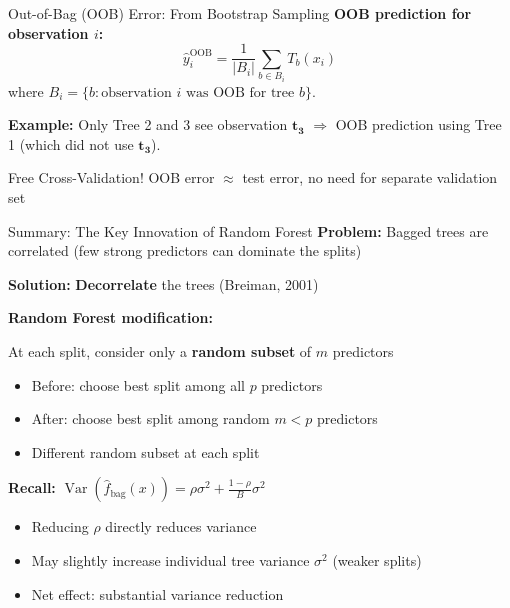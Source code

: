 \documentclass[10pt]{beamer}
\newcommand{\highlight}[1]{\textcolor{AccentOrange}{\textbf{#1}}}
\DeclareMathOperator{\Var}{Var}
\begin{document}
\begin{frame}{Out-of-Bag (OOB) Error: From Bootstrap Sampling}
  \vspace{0.2em}
\textbf{OOB prediction for observation $i$:}
  \[
  \widehat{y}_i^{\text{OOB}} = \frac{1}{|B_i|} \sum_{b \in B_i} T_b(x_i)
  \]
  where $B_i = \{b : \text{observation } i \text{ was OOB for tree } b\}$.

  \vspace{1em}
  \textbf{Example:} Only Tree 2 and 3 see observation $\mathbf{t_3}$ $\Rightarrow$ OOB prediction using Tree 1 (which did not use $\mathbf{t_3}$).

  \vspace{0.3em}
  \begin{block}{Free Cross-Validation!}
    OOB error $\approx$ test error, no need for separate validation set
  \end{block}
\end{frame}


\begin{frame}{Summary: The Key Innovation of Random Forest}
  \textbf{Problem:} Bagged trees are correlated (few strong predictors can dominate the splits)

  \vspace{0.3em}
  \textbf{Solution:} \highlight{Decorrelate} the trees (Breiman, 2001)

  \vspace{1em}
  \textbf{Random Forest modification:}

  At each split, consider only a \highlight{random subset} of $m$ predictors

  \vspace{0.5em}
  \begin{itemize}
    \item Before: choose best split among all $p$ predictors
    \item After: choose best split among random $m < p$ predictors
    \item Different random subset at each split
  \end{itemize}

 \vspace{1em}
  \textbf{Recall:} $\Var\left(\widehat{f}_{\text{bag}}(x)\right) = \rho\sigma^2 + \frac{1-\rho}{B}\sigma^2$

  \vspace{0.5em}
  \begin{itemize}
    \item Reducing $\rho$ directly reduces variance
    \item May slightly increase individual tree variance $\sigma^2$ (weaker splits)
    \item Net effect: substantial variance reduction
  \end{itemize}
\end{frame}
\end{document}
